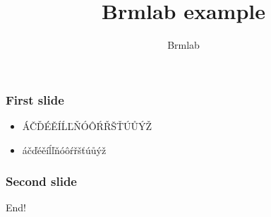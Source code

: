 \documentclass{beamer}
\title{Brmlab example}
\author{Brmlab}
\begin{document}
\maketitle

\begin{frame}

\frametitle{First slide}

\begin{itemize}
\item ÁČĎÉĚÍĹĽŇÓÔŔŘŠŤÚŮÝŽ
\item áčďéěíĺľňóôŕřšťúůýž
\end{itemize}

\end{frame}

\begin{frame}

\frametitle{Second slide}

End!

\end{frame}
\end{document}
